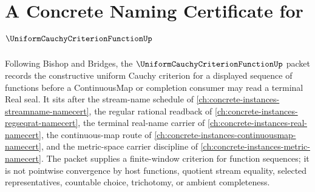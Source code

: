 \chapter{A Concrete Naming Certificate for $\UniformCauchyCriterionFunctionUp$}
\label{ch:concrete-instances-uniform-cauchy-criterion-function-namecert}

Following Bishop and Bridges, the $\UniformCauchyCriterionFunctionUp$ packet records the constructive uniform Cauchy criterion for a displayed sequence of functions before a ContinuousMap or completion consumer may read a terminal Real seal. It sits after the stream-name schedule of \autoref{ch:concrete-instances-streamname-namecert}, the regular rational readback of \autoref{ch:concrete-instances-regseqrat-namecert}, the terminal real-name carrier of \autoref{ch:concrete-instances-real-namecert}, the continuous-map route of \autoref{ch:concrete-instances-continuousmap-namecert}, and the metric-space carrier discipline of \autoref{ch:concrete-instances-metric-namecert}. The packet supplies a finite-window criterion for function sequences; it is not pointwise convergence by host functions, quotient stream equality, selected representatives, countable choice, trichotomy, or ambient completeness.

